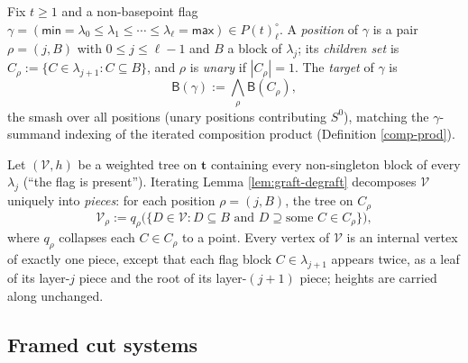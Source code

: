 \documentclass[12pt]{amsart}
\theoremstyle{definition}
\theoremstyle{remark}
\newcommand{\Cal}[1]{\mathcal{#1}}
\newcommand{\BC}{\mathsf{B}}                     %
\begin{document}
Fix $t\geq 1$ and a non-basepoint flag $\gamma = (\mathsf{min} = \lambda_0\leq \lambda_1\leq \cdots \leq \lambda_\ell = \mathsf{max})\in P(t)^{\circ}_{\ell}$. A \emph{position} of $\gamma$ is a pair $\rho = (j, B)$ with $0\leq j\leq \ell-1$ and $B$ a block of $\lambda_j$; its \emph{children set} is $C_\rho := \{C\in \lambda_{j+1}: C\subseteq B\}$, and $\rho$ is \emph{unary} if $|C_\rho| = 1$. The \emph{target} of $\gamma$ is
\[ \BC(\gamma) := \bigwedge_{\rho} \BC(C_\rho),\]
the smash over all positions (unary positions contributing $S^0$), matching the $\gamma$-summand indexing of the iterated composition product (Definition \ref{comp-prod}).

Let $(\Cal{V},h)$ be a weighted tree on $\mathbf{t}$ containing every non-singleton block of every $\lambda_j$ (``the flag is present''). Iterating Lemma \ref{lem:graft-degraft} decomposes $\Cal{V}$ uniquely into \emph{pieces}: for each position $\rho = (j,B)$, the tree on $C_\rho$
\[ \Cal{V}_\rho := q_\rho\big( \{ D\in \Cal{V} : D\subseteq B \text{ and } D\supseteq \text{some } C\in C_\rho \} \big),\]
where $q_\rho$ collapses each $C\in C_\rho$ to a point. Every vertex of $\Cal{V}$ is an internal vertex of exactly one piece, except that each flag block $C\in\lambda_{j+1}$ appears twice, as a leaf of its layer-$j$ piece and the root of its layer-$(j{+}1)$ piece; heights are carried along unchanged.

\subsection{Framed cut systems}\label{sec:FS}
\end{document}

